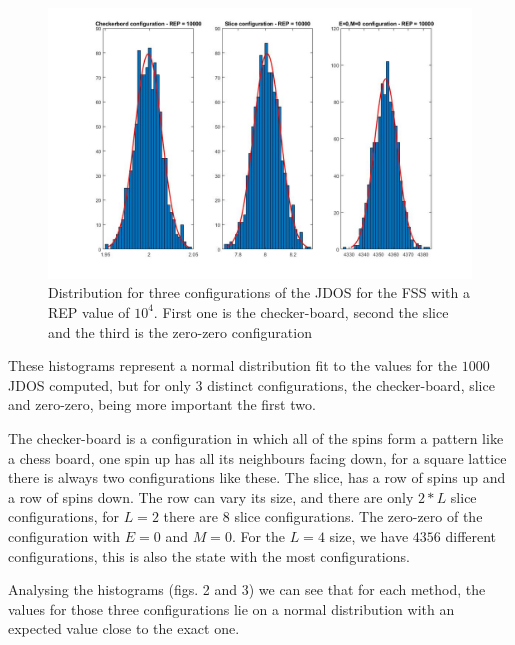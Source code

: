 \documentclass[a4paper, 11pt]{article}
\begin{document}
	\begin{figure}[h]
		\includegraphics[scale=0.27]{hist_10E4_new_rps}
		\centering
		\caption{Distribution for three configurations of the JDOS for the FSS with a REP value of $10^4$. First one is the checker-board, second the slice and the third is the zero-zero configuration}
	\end{figure}

	\newpage
	
	These histograms represent a normal distribution fit to the values for the $1000$ JDOS computed, but for only $3$ distinct configurations, the checker-board, slice and zero-zero, being more important the first two. 
	
	The checker-board is a configuration in which all of the spins form a pattern like a chess board, one spin up has all its neighbours facing down, for a square lattice there is always two configurations like these. The slice, has a row of spins up and a row of spins down. The row can vary its size, and there are only $2*L$ slice configurations, for $L=2$ there are $8$ slice configurations. The zero-zero of the configuration with $E=0$ and $M=0$. For the $L=4$ size, we have $4356$ different configurations, this is also the state with the most configurations.
	
	Analysing the histograms (figs. 2 and 3) we can see that for each method, the values for those three configurations lie on a normal distribution with an expected value close to the exact one.
	
\end{document}
